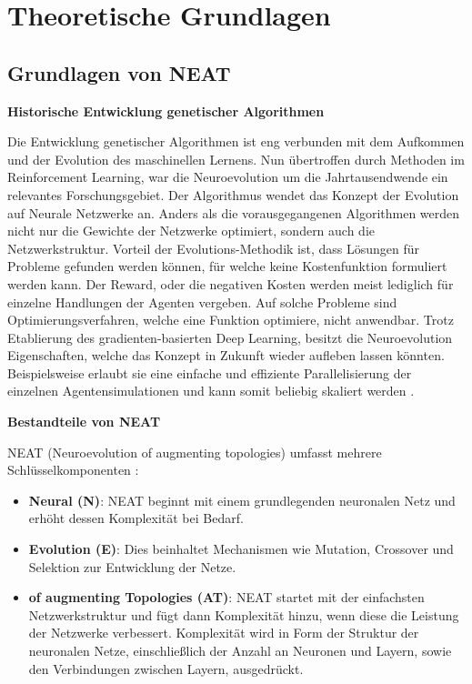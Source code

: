 \chapter{Theoretische Grundlagen}
\label{chapter:2}

\section{Grundlagen von NEAT}

\textbf{Historische Entwicklung genetischer Algorithmen}

Die Entwicklung genetischer Algorithmen ist eng verbunden mit dem Aufkommen und der Evolution des maschinellen Lernens. Nun übertroffen durch Methoden im Reinforcement Learning, war die Neuroevolution um die Jahrtausendwende ein relevantes Forschungsgebiet. Der Algorithmus wendet das Konzept der Evolution auf Neurale Netzwerke an. Anders als die vorausgegangenen Algorithmen werden nicht nur die Gewichte der Netzwerke optimiert, sondern auch die Netzwerkstruktur. Vorteil der Evolutions-Methodik ist, dass Lösungen für Probleme gefunden werden können, für welche keine Kostenfunktion formuliert werden kann. Der Reward, oder die negativen Kosten werden meist lediglich für einzelne Handlungen der Agenten vergeben. Auf solche Probleme sind Optimierungsverfahren, welche eine Funktion optimiere, nicht anwendbar. 
Trotz Etablierung des gradienten-basierten Deep Learning, besitzt die Neuroevolution Eigenschaften, welche das Konzept in Zukunft wieder aufleben lassen könnten. Beispielsweise erlaubt sie eine einfache und effiziente Parallelisierung der einzelnen Agentensimulationen und kann somit beliebig skaliert werden \cite{Such2017DeepNG}. 

\textbf{Bestandteile von NEAT}

NEAT (Neuroevolution of augmenting topologies) umfasst mehrere Schlüsselkomponenten \cite{NEAT}:

\begin{itemize}
	\item \textbf{Neural (N)}: NEAT beginnt mit einem grundlegenden neuronalen Netz und erhöht dessen Komplexität bei Bedarf.
	\item \textbf{Evolution (E)}: Dies beinhaltet Mechanismen wie Mutation, Crossover und Selektion zur Entwicklung der Netze.
	\item \textbf{of augmenting Topologies (AT)}: NEAT startet mit der einfachsten Netzwerkstruktur und fügt dann Komplexität hinzu, wenn diese die Leistung der Netzwerke verbessert. Komplexität wird in Form der Struktur der neuronalen Netze, einschließlich der Anzahl an Neuronen und Layern, sowie den Verbindungen zwischen Layern, ausgedrückt.
\end{itemize}

